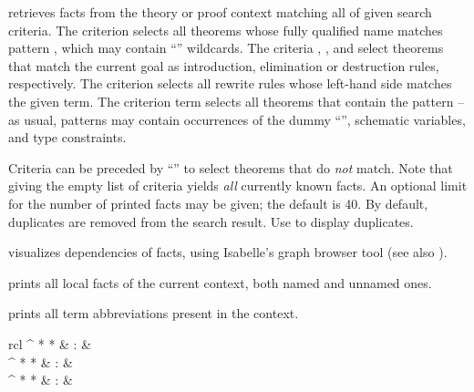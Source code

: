 \begin{isabellebody}
\begin{isamarkuptext}
\begin{descr}
  \item [\mbox{\isa{\isacommand{find{\isacharunderscore}theorems}}}~\isa{criteria}] retrieves facts
  from the theory or proof context matching all of given search
  criteria.  The criterion  selects all theorems
  whose fully qualified name matches pattern , which may
  contain ``\isa{{\isachardoublequote}{\isacharasterisk}{\isachardoublequote}}'' wildcards.  The criteria ,
  , and  select theorems that match the
  current goal as introduction, elimination or destruction rules,
  respectively.  The criterion  selects all rewrite
  rules whose left-hand side matches the given term.  The criterion
  term  selects all theorems that contain the pattern  -- as usual, patterns may contain occurrences of the dummy
  ``\isa{{\isacharunderscore}}'', schematic variables, and type constraints.
  
  Criteria can be preceded by ``\isa{{\isachardoublequote}{\isacharminus}{\isachardoublequote}}'' to select theorems that
  do \emph{not} match. Note that giving the empty list of criteria
  yields \emph{all} currently known facts.  An optional limit for the
  number of printed facts may be given; the default is 40.  By
  default, duplicates are removed from the search result. Use
  \mbox{} to display duplicates.
  
  \item [\mbox{\isa{\isacommand{thm{\isacharunderscore}deps}}}~\isa{{\isachardoublequote}a\isactrlsub {\isadigit{1}}\ {\isasymdots}\ a\isactrlsub n{\isachardoublequote}}]
  visualizes dependencies of facts, using Isabelle's graph browser
  tool (see also \cite{isabelle-sys}).
  
  \item [\mbox{\isa{\isacommand{print{\isacharunderscore}facts}}}] prints all local facts of the
  current context, both named and unnamed ones.
  
  \item [\mbox{\isa{\isacommand{print{\isacharunderscore}binds}}}] prints all term abbreviations
  present in the context.

  \end{descr}%
\end{isamarkuptext}%
\isamarkuptrue%
%
\isamarkuptrue%
%
\begin{isamarkuptext}%
\begin{matharray}{rcl}
    \mbox{}^{{ * }{ * }} & : & \isarkeep{\cdot} \\
    \mbox{}^{{ * }{ * }} & : & \isarkeep{\cdot} \\
    \mbox{}^{{ * }{ * }} & : & \isarkeep{\cdot} \\
  \end{matharray}


\end{isamarkuptext}
\end{isabellebody}
